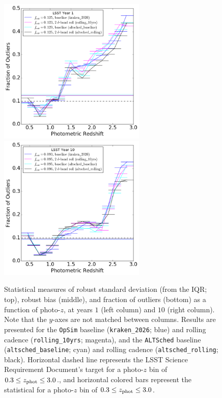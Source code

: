 \begin{figure}
\begin{center}
\includegraphics[width=7cm,trim={0cm 0cm 0cm 0cm},clip]{figures/ALTyear1_fout.png}
\includegraphics[width=7cm,trim={0cm 0cm 0cm 0cm},clip]{figures/ALTyear10_fout.png}
\caption{Statistical measures of robust standard deviation (from the IQR; top), robust bias (middle), and fraction of outliers (bottom) as a function of photo-$z$, at years $1$ (left column) and $10$ (right column). Note that the $y$-axes are not matched between columns. Results are presented for the {\tt OpSim} baseline ({\tt kraken\_2026}; blue) and rolling cadence ({\tt rolling\_10yrs}; magenta), and the {\tt ALTSched} baseline ({\tt altsched\_baseline}; cyan) and rolling cadence ({\tt altsched\_rolling}; black). Horizontal dashed line represents the LSST Science Requirement Document's target for a photo-$z$ bin of $0.3 \leq z_{\rm phot} \leq 3.0$., and horizontal colored bars represent the statistical for a photo-$z$ bin of $0.3 \leq z_{\rm phot} \leq 3.0$. \label{fig:stats_altsched}}
\end{center}
\end{figure}

